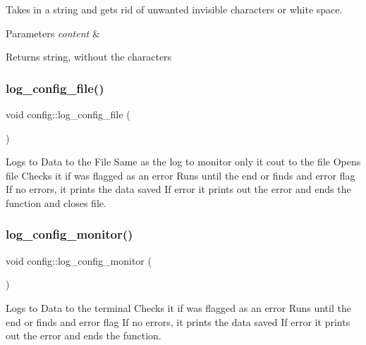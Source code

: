 Takes in a string and gets rid of unwanted invisible characters or white space. 


\begin{DoxyParams}{Parameters}
{\em content} & \\
\hline
\end{DoxyParams}
\begin{DoxyReturn}{Returns}
string, without the characters 
\end{DoxyReturn}
\mbox{\label{classconfig_af5a46d231093e078b6356897f8fece32}} 
\subsubsection{\texorpdfstring{log\_config\_file()}{log\_config\_file()}}
{\footnotesize\ttfamily void config\+::log\+\_\+config\+\_\+file (\begin{DoxyParamCaption}{ }\end{DoxyParamCaption})}



Logs to Data to the File Same as the log to monitor only it cout to the file Opens file Checks it if was flagged as an error Runs until the end or finds and error flag If no errors, it prints the data saved If error it prints out the error and ends the function and closes file. 

\mbox{\label{classconfig_a83e282187a1be39b49284568053b5064}} 
\subsubsection{\texorpdfstring{log\_config\_monitor()}{log\_config\_monitor()}}
{\footnotesize\ttfamily void config\+::log\+\_\+config\+\_\+monitor (\begin{DoxyParamCaption}{ }\end{DoxyParamCaption})}



Logs to Data to the terminal Checks it if was flagged as an error Runs until the end or finds and error flag If no errors, it prints the data saved If error it prints out the error and ends the function. 

\mbox{\label{classconfig_af2de59fd72d20777f086a19404740918}} 
